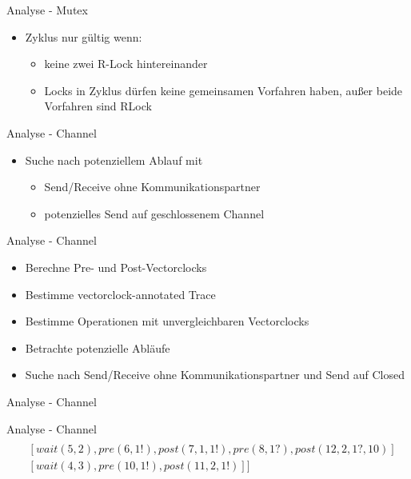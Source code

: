 \documentclass[aspectratio=169]{beamer}  %
\begin{document}
\begin{frame}{Analyse - Mutex}
  \begin{itemize}
    \item Zyklus nur gültig wenn:
    \begin{itemize}
      \item keine zwei R-Lock hintereinander
      \item Locks in Zyklus dürfen keine gemeinsamen Vorfahren haben, außer beide 
        Vorfahren sind RLock
    \end{itemize}
  \end{itemize}
\end{frame}

\begin{frame}{Analyse - Channel}
  \begin{itemize}
    \item Suche nach potenziellem Ablauf mit 
    \begin{itemize}
      \item Send/Receive ohne Kommunikationspartner
      \item potenzielles Send auf geschlossenem Channel
    \end{itemize} 
  \end{itemize}
\end{frame}

\begin{frame}{Analyse - Channel}
  \begin{itemize}
    \item Berechne Pre- und Post-Vectorclocks
    \item Bestimme vectorclock-annotated Trace
    \item Bestimme Operationen mit unvergleichbaren Vectorclocks
    \item Betrachte potenzielle Abläufe 
    \item Suche nach Send/Receive ohne Kommunikationspartner und Send auf Closed
  \end{itemize}
\end{frame}

\begin{frame}{Analyse - Channel}
    
\end{frame}

\begin{frame}{Analyse - Channel}
  \begin{align*}
    [&[signal(1, 2), signal(2, 3), pre(3, 1?), post(9, 1, 1?, 6)]\\
    &[wait(5, 2), pre(6, 1!), post(7, 1, 1!), pre(8, 1?), post(12, 2, 1?, 10)]\\
    &[wait(4, 3), pre(10, 1!), post(11, 2, 1!)]]
  \end{align*}
\end{frame}
\end{document}
